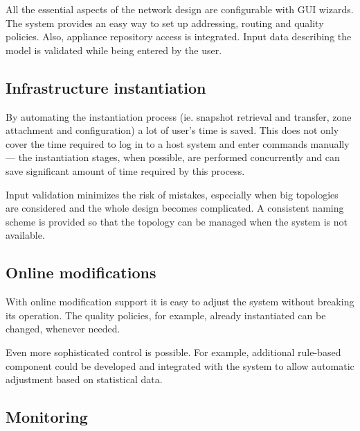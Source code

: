 \documentclass[11pt]{book}
\begin{document}
        All the essential aspects of the network design are configurable with GUI wizards. The system provides an easy
        way to set up addressing, routing and quality policies. Also, appliance repository access is integrated. Input
        data describing the model is validated while being entered by the user. 


      \subsection{Infrastructure instantiation}
      \label{sub:uc:enhance:instantiation}

        By automating the instantiation process (ie. snapshot retrieval and transfer, zone attachment and configuration)
        a lot of user's time is saved. This does not only cover the time required to log in to a host system and enter
        commands manually --- the instantiation stages, when possible, are performed concurrently and can save
        significant amount of time required by this process.

        Input validation minimizes the risk of mistakes, especially when big topologies are considered and the whole
        design becomes complicated. A consistent naming scheme is provided so that the topology can be managed when the
        system is not available.



      \subsection{Online modifications}
      \label{sub:uc:enhance:online}

        With online modification support it is easy to adjust the system without breaking its operation. The quality
        policies, for example, already instantiated can be changed, whenever needed.

        Even more sophisticated control is possible. For example, additional rule-based component could be developed and
        integrated with the system to allow automatic adjustment based on statistical data.


      \subsection{Monitoring}
      \label{sub:uc:enhance:monitoring}
\end{document}
